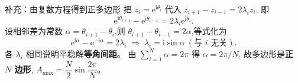 \documentclass[fontset=windows, chinese, 10pt, xcolor=dvipsnames]{beamer}
\begin{document}
\begin{frame}{补充：由复数方程得到正多边形}
  把 $z_i=\mathrm{e}^{\mathrm{i}\theta_i}$ 代入 $z_{i+1}-z_{i-1}=2\lambda_i z_i$,
  即
  \begin{equation*}
    \mathrm{e}^{\mathrm{i}\theta_{i+1}}-\mathrm{e}^{\mathrm{i}\theta_{i-1}}
    = 2\lambda_i \mathrm{e}^{\mathrm{i}\theta_i}.
  \end{equation*}
  设相邻差为常数 $\alpha=\theta_{i+1}-\theta_i$,则
  $\theta_{i+1}-\theta_{i-1}=2\alpha$,等式化为
  \begin{equation*}
    \mathrm{e}^{\mathrm{i}\alpha}-\mathrm{e}^{-\mathrm{i}\alpha}=2\lambda_i
    \;\Longrightarrow\;
    \lambda_i = \mathrm{i}\sin\alpha\ (\text{与 }i\text{ 无关}).
  \end{equation*}
  各 $\lambda_i$ 相同说明平稳解\textbf{等角间距}。
  由 $\sum_{i=1}^N\alpha=2\pi$ 得 $\alpha=2\pi/N$,
  故多边形是\textbf{正 $N$ 边形},
  $A_{\max}=\dfrac{N}{2}\sin\dfrac{2\pi}{N}$。
\end{frame}
\end{document}
